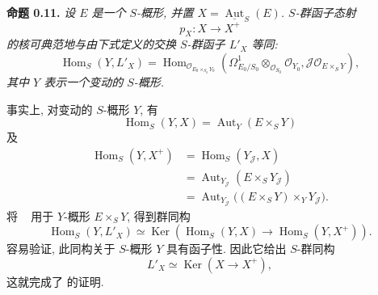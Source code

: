 
\setcounter{footnote}{28}

\medskip
\noindent{}\textbf{命题 0.11.}
\textit{设 \(E\) 是一个 \(S\)-概形, 并置
\(X=\underline{\operatorname{Aut}}_S(E)\).
\(S\)-群函子态射}
\[
 p_X:X\longrightarrow X^+
\]
\textit{的核可典范地与由下式定义的交换 \(S\)-群函子 \(L'_X\) 等同:}
\[
 \operatorname{Hom}_S(Y,L'_X)
 =\operatorname{Hom}_{\mathscr O_{E_0\times_{S_0}Y_0}}
 \left(
   \Omega^1_{E_0/S_0}\otimes_{\mathscr O_{S_0}}\mathscr O_{Y_0},
   \mathscr J\mathscr O_{E\times_S Y}
 \right),
\]
\textit{其中 \(Y\) 表示一个变动的 \(S\)-概形.}

事实上, 对变动的 \(S\)-概形 \(Y\), 有
\[
 \operatorname{Hom}_S(Y,X)=\operatorname{Aut}_Y(E\times_S Y)
\]
及
\begin{align*}
 \operatorname{Hom}_S(Y,X^+)
  &=\operatorname{Hom}_S(Y_{\mathscr J},X)\\
  &=\operatorname{Aut}_{Y_{\mathscr J}}(E\times_S Y_{\mathscr J})\\
  &=\operatorname{Aut}_{Y_{\mathscr J}}
    \bigl((E\times_S Y)\times_Y Y_{\mathscr J}\bigr).
\end{align*}
将 ~
用于 \(Y\)-概形 \(E\times_S Y\), 得到群同构
\[
 \operatorname{Hom}_S(Y,L'_X)
 \simeq
 \operatorname{Ker}\!\left(
   \operatorname{Hom}_S(Y,X)\longrightarrow
   \operatorname{Hom}_S(Y,X^+)
 \right).
\]
容易验证, 此同构关于 \(S\)-概形 \(Y\) 具有函子性.
因此它给出 \(S\)-群同构
\[
 L'_X\simeq\operatorname{Ker}(X\longrightarrow X^+),
\]
这就完成了 的证明.

